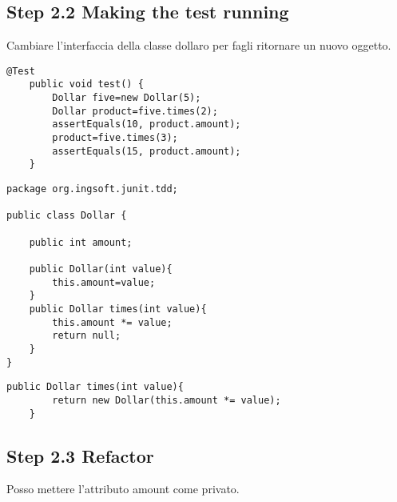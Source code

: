 \documentclass{article}
\begin{document}
\subsection{Step 2.2 Making the test running}
Cambiare l'interfaccia della classe dollaro per fagli ritornare un nuovo oggetto.
\begin{lstlisting}
@Test
	public void test() {
		Dollar five=new Dollar(5);
		Dollar product=five.times(2);
		assertEquals(10, product.amount);
		product=five.times(3);
		assertEquals(15, product.amount);
	}
\end{lstlisting}

\begin{lstlisting}
package org.ingsoft.junit.tdd;

public class Dollar {
	
	public int amount;
	
	public Dollar(int value){
		this.amount=value;
	}
	public Dollar times(int value){
		this.amount *= value;
		return null;
	}
}
\end{lstlisting}


\begin{lstlisting}
public Dollar times(int value){
		return new Dollar(this.amount *= value);
	}
\end{lstlisting}



\subsection{Step 2.3 Refactor}
Posso mettere l'attributo amount come privato.
\end{document}
